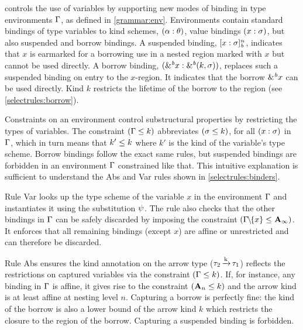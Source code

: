 \lang controls the use of variables by supporting new modes of
binding in type environments $\Gamma$, as defined in \cref{grammar:env}.
Environments contain standard bindings of type variables to kind schemes,
$(\alpha : \theta)$, value bindings $(x : \sigma)$, but also
suspended and borrow bindings.
A suspended binding, $[x : \sigma]_{\textit{b}}^n$, indicates that $x$ is
earmarked for a borrowing use in a nested region
marked with $x$ %
but
cannot be used directly.
A borrow binding, $({\&}^{\textit{b}}x : {\&}^{\textit{b}}(k,\sigma))$, replaces
such a suspended binding on entry to the $x$-region. It indicates
that the borrow ${\&}^{\textit{b}}x$ can be used directly. Kind $k$
restricts the lifetime of the borrow to the region (see \cref{selectrules:borrow}).


Constraints on an environment control substructural properties by
restricting the types of variables.  The constraint $(\Gamma \leq k)$
abbreviates $(\sigma \leq k)$, for all $(x : \sigma)$
in $\Gamma$, which in turn means that $k' \leq k$ where $k'$ is the kind of
the variable's type scheme.
Borrow bindings follow the exact same rules, but suspended bindings
are forbidden in an environment $\Gamma$ constrained like that.
This intuitive explanation is sufficient to understand
the {\sc Abs} and {\sc Var} rules shown in
\cref{selectrules:binders}.

Rule {\sc Var} looks up the type scheme of the variable $x$ in
the environment $\Gamma$
and instantiates it using the substitution $\mathrm{\psi}$. The rule also
checks that the other bindings in $\Gamma$ can be safely discarded by
imposing the constraint $(\Gamma\!\!\mathbin{\setminus}\!\!\{x\} \leq \mathbf{A}_\infty)$.
It enforces that all remaining bindings (except $x$) are affine or
unrestricted and can therefore be discarded.

Rule {\sc Abs} ensures the kind annotation on the arrow type
($\tau_2 \operatorname{\xrightarrow{k}} \tau_1$) reflects the restrictions on captured variables
via the constraint $(\Gamma \leq k)$.
If, for instance, any binding in $\Gamma$ is affine, it gives rise to the
constraint $(\mathbf{A}_n \leq k)$ and the arrow kind is at least
affine at nesting level $n$.
Capturing a borrow is perfectly fine: the kind of the borrow is also a
lower bound of the arrow kind $k$ which restricts the closure
to the region of the borrow.
Capturing a suspended binding is forbidden.




